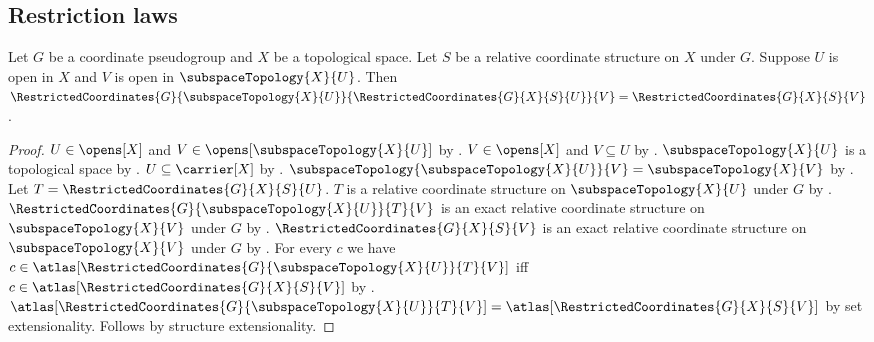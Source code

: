 \subsection{Restriction laws}

\begin{theorem}\label{restricted_coordinates_nested}
    Let $G$ be a coordinate pseudogroup and $X$ be a topological space.
    Let $S$ be a relative coordinate structure on $X$ under $G$.
    Suppose $U$ is open in $X$ and $V$ is open in $\subspaceTopology{X}{U}$.
    Then $\RestrictedCoordinates{G}{\subspaceTopology{X}{U}}{\RestrictedCoordinates{G}{X}{S}{U}}{V}
        =\RestrictedCoordinates{G}{X}{S}{V}$.
\end{theorem}
\begin{proof}
    $U\in\opens[X]$ and $V\in\opens[\subspaceTopology{X}{U}]$ by .
    $V\in\opens[X]$ and $V\subseteq U$ by .
    $\subspaceTopology{X}{U}$ is a topological space by .
    $U\subseteq\carrier[X]$ by .
    $\subspaceTopology{\subspaceTopology{X}{U}}{V}=\subspaceTopology{X}{V}$ by
        .
    Let $T=\RestrictedCoordinates{G}{X}{S}{U}$.
    $T$ is a relative coordinate structure on $\subspaceTopology{X}{U}$ under $G$ by
        .
    $\RestrictedCoordinates{G}{\subspaceTopology{X}{U}}{T}{V}$ is an exact relative coordinate structure
        on $\subspaceTopology{X}{V}$ under $G$ by .
    $\RestrictedCoordinates{G}{X}{S}{V}$ is an exact relative coordinate structure
        on $\subspaceTopology{X}{V}$ under $G$ by .
    For every $c$ we have $c\in\atlas[\RestrictedCoordinates{G}{\subspaceTopology{X}{U}}{T}{V}]$ iff
        $c\in\atlas[\RestrictedCoordinates{G}{X}{S}{V}]$ by
        .
    $\atlas[\RestrictedCoordinates{G}{\subspaceTopology{X}{U}}{T}{V}]
        =\atlas[\RestrictedCoordinates{G}{X}{S}{V}]$ by set extensionality.
    Follows by structure extensionality.
\end{proof}

